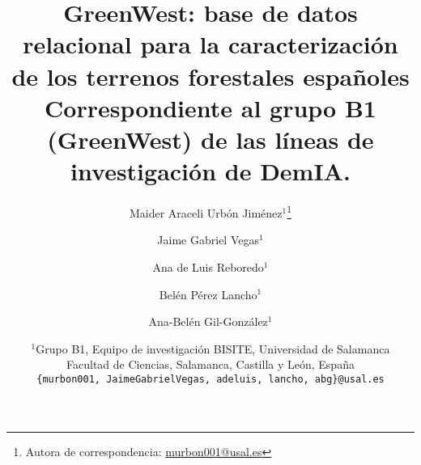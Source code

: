 \documentclass[11pt,a4paper]{article}
\title{\textbf{GreenWest: base de datos relacional para la caracterización de los terrenos forestales españoles}\\[4pt]
\small{Correspondiente al grupo B1 (GreenWest) de las líneas de investigación de DemIA.}}
\author{
Maider Araceli Urbón Jiménez$^{1}$\thanks{Autora de correspondencia: \href{mailto:murbon001@usal.es}{murbon001@usal.es}} \and
Jaime Gabriel Vegas$^{1}$ \and
Ana de Luis Reboredo$^{1}$ \and
Belén Pérez Lancho$^{1}$ \and
Ana-Belén Gil-González$^{1}$}
\date{
\small
$^{1}$Grupo B1, Equipo de investigación BISITE, Universidad de Salamanca\\
Facultad de Ciencias, Salamanca, Castilla y León, España\\[4pt]
\texttt{\{murbon001, JaimeGabrielVegas, adeluis, lancho, abg\}@usal.es}
}
\begin{document}
\maketitle


\begin{abstract}

\end{abstract}




\newpage


\newpage


\newpage


\newpage


\newpage


\newpage


\newpage


\newpage


% 
\printbibliography
\end{document}
